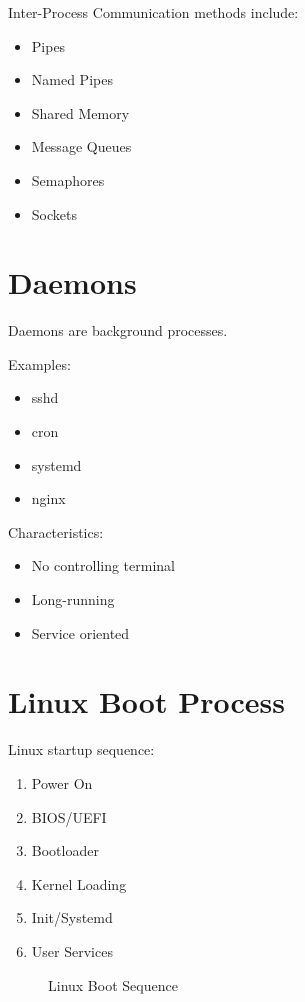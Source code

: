 Inter-Process Communication methods include:

\begin{itemize}
\item Pipes
\item Named Pipes
\item Shared Memory
\item Message Queues
\item Semaphores
\item Sockets
\end{itemize}

\section{Daemons}

Daemons are background processes.

Examples:

\begin{itemize}
\item sshd
\item cron
\item systemd
\item nginx
\end{itemize}

Characteristics:

\begin{itemize}
\item No controlling terminal
\item Long-running
\item Service oriented
\end{itemize}

\section{Linux Boot Process}

Linux startup sequence:

\begin{enumerate}
\item Power On
\item BIOS/UEFI
\item Bootloader
\item Kernel Loading
\item Init/Systemd
\item User Services
\end{enumerate}

\begin{figure}[H]
\centering
{}
\caption{Linux Boot Sequence}
\end{figure}

